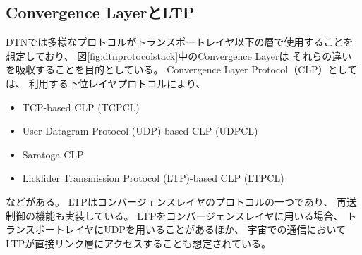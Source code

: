 \subsection{Convergence LayerとLTP}
\label{subsection:Convergence LayerとLTP}
DTNでは多様なプロトコルがトランスポートレイヤ以下の層で使用することを想定しており、 図\ref{fig:dtnprotocolstack}中のConvergence Layerは
それらの違いを吸収することを目的としている。 Convergence Layer Protocol（CLP）としては、 
利用する下位レイヤプロトコルにより、
\begin{itemize}
    \item TCP-based CLP (TCPCL)
    \item User Datagram Protocol (UDP)-based CLP (UDPCL)
    \item Saratoga CLP
    \item Licklider Transmission Protocol (LTP)-based CLP (LTPCL)
\end{itemize}
などがある。
LTP\cite{rfc5326}はコンバージェンスレイヤのプロトコルの一つであり、 再送制御の機能も実装している。
LTPをコンバージェンスレイヤに用いる場合、 トランスポートレイヤにUDPを用いることがあるほか、 
宇宙での通信においてLTPが直接リンク層にアクセスすることも想定されている。
